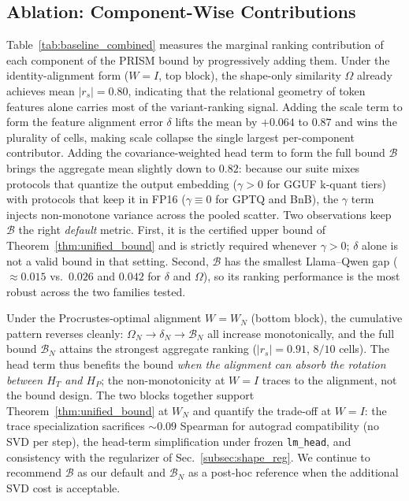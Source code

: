 \documentclass{article}
\begin{document}
\subsection{Ablation: Component-Wise Contributions}
\label{subsec:ablation}



Table~\ref{tab:baseline_combined} measures the marginal ranking contribution of each component of the PRISM bound by progressively adding them. Under the identity-alignment form ($W{=}I$, top block), the shape-only similarity $\Omega$ already achieves mean $|r_s|{=}0.80$, indicating that the relational geometry of token features alone carries most of the variant-ranking signal. Adding the scale term to form the feature alignment error $\delta$ lifts the mean by $+0.064$ to $0.87$ and wins the plurality of cells, making scale collapse the single largest per-component contributor. Adding the covariance-weighted head term to form the full bound $\mathcal{B}$ brings the aggregate mean slightly down to $0.82$: because our suite mixes protocols that quantize the output embedding ($\gamma{>}0$ for GGUF k-quant tiers) with protocols that keep it in FP16 ($\gamma{\equiv}0$ for GPTQ and BnB), the $\gamma$ term injects non-monotone variance across the pooled scatter. Two observations keep $\mathcal{B}$ the right \emph{default} metric. First, it is the certified upper bound of Theorem~\ref{thm:unified_bound} and is strictly required whenever $\gamma{>}0$; $\delta$ alone is not a valid bound in that setting. Second, $\mathcal{B}$ has the smallest Llama--Qwen gap ($\approx 0.015$ vs.\ $0.026$ and $0.042$ for $\delta$ and $\Omega$), so its ranking performance is the most robust across the two families tested.

Under the Procrustes-optimal alignment $W{=}W_N$ (bottom block), the cumulative pattern reverses cleanly: $\Omega_N \to \delta_N \to \mathcal{B}_N$ all increase monotonically, and the full bound $\mathcal{B}_N$ attains the strongest aggregate ranking ($|r_s|{=}0.91$, $8/10$ cells). The head term thus benefits the bound \emph{when the alignment can absorb the rotation between $H_T$ and $H_P$}; the non-monotonicity at $W{=}I$ traces to the alignment, not the bound design. The two blocks together support Theorem~\ref{thm:unified_bound} at $W_N$ and quantify the trade-off at $W{=}I$: the trace specialization sacrifices $\sim$$0.09$ Spearman for autograd compatibility (no SVD per step), the head-term simplification under frozen \texttt{lm\_head}, and consistency with the regularizer of Sec.~\ref{subsec:shape_reg}. We continue to recommend $\mathcal{B}$ as our default and $\mathcal{B}_N$ as a post-hoc reference when the additional SVD cost is acceptable.
\end{document}
